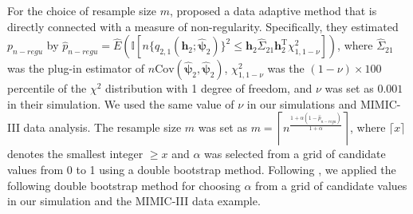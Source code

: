 \documentclass[12pt]{article}
\begin{document}


For the choice of resample size $m$, \cite{chakraborty2013inference} proposed a data adaptive method that is directly connected with a measure of non-regularity. 
Specifically, they estimated $p_{n-{regu}}$ by $\widehat{p}_{n-regu} = \widehat{E}(\mathbb{I}[n \{q_{2,1}(\bm{h}_2;\widehat{\bm{\psi}}_2)\}^2 \leq \bm{h}_2\widehat{\Sigma}_{21}\bm{h}_2^{\mathrm{T}} \chi^2_{1,1-\nu}])$, where $\widehat{\Sigma}_{21}$ was the plug-in estimator of $n\text{Cov}(\widehat{\bm{\psi}}_2,\widehat{\bm{\psi}}_2)$, $\chi^2_{1,1-\nu}$ was the $(1-\nu)\times 100$ percentile of the $\chi^2$ distribution with 1 degree of freedom, and $\nu$ was set as $0.001$ in their simulation. We used the same value of $\nu$ in our simulations and MIMIC-III data analysis. The resample size $m$ was set as  $m = \left\lceil n^{\frac{1+\alpha(1-\widehat{p}_{n-regu})}{1+\alpha}} \right\rceil$, where $\lceil x \rceil$ denotes the smallest integer $\geq x$ and $\alpha$ was selected from a grid of candidate values from 0 to 1 using a double bootstrap method.   
Following \cite{chakraborty2013inference}, we applied the following double bootstrap method for choosing $\alpha$ from a grid of candidate values in our simulation and the MIMIC-III data example.
\end{document}
